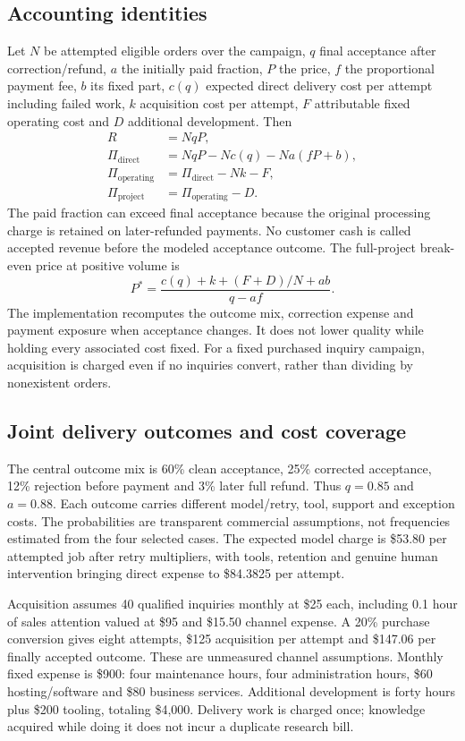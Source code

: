 \subsection{Accounting identities}
Let $N$ be attempted eligible orders over the campaign, $q$ final acceptance after correction/refund, $a$ the initially paid fraction, $P$ the price, $f$ the proportional payment fee, $b$ its fixed part, $c(q)$ expected direct delivery cost per attempt including failed work, $k$ acquisition cost per attempt, $F$ attributable fixed operating cost and $D$ additional development. Then
\begin{align}
R &= NqP,\\
\Pi_{\mathrm{direct}} &= NqP-Nc(q)-Na(fP+b),\\
\Pi_{\mathrm{operating}} &= \Pi_{\mathrm{direct}}-Nk-F,\\
\Pi_{\mathrm{project}} &= \Pi_{\mathrm{operating}}-D.
\end{align}
The paid fraction can exceed final acceptance because the original processing charge is retained on later-refunded payments. No customer cash is called accepted revenue before the modeled acceptance outcome. The full-project break-even price at positive volume is
\begin{equation}
P^* = \frac{c(q)+k+(F+D)/N+ab}{q-af}.
\end{equation}
The implementation recomputes the outcome mix, correction expense and payment exposure when acceptance changes. It does not lower quality while holding every associated cost fixed. For a fixed purchased inquiry campaign, acquisition is charged even if no inquiries convert, rather than dividing by nonexistent orders.

\subsection{Joint delivery outcomes and cost coverage}
The central outcome mix is 60\% clean acceptance, 25\% corrected acceptance, 12\% rejection before payment and 3\% later full refund. Thus $q=0.85$ and $a=0.88$. Each outcome carries different model/retry, tool, support and exception costs. The probabilities are transparent commercial assumptions, not frequencies estimated from the four selected cases. The expected model charge is \$53.80 per attempted job after retry multipliers, with tools, retention and genuine human intervention bringing direct expense to \$84.3825 per attempt.

Acquisition assumes 40 qualified inquiries monthly at \$25 each, including 0.1 hour of sales attention valued at \$95 and \$15.50 channel expense. A 20\% purchase conversion gives eight attempts, \$125 acquisition per attempt and \$147.06 per finally accepted outcome. These are unmeasured channel assumptions. Monthly fixed expense is \$900: four maintenance hours, four administration hours, \$60 hosting/software and \$80 business services. Additional development is forty hours plus \$200 tooling, totaling \$4,000. Delivery work is charged once; knowledge acquired while doing it does not incur a duplicate research bill.

